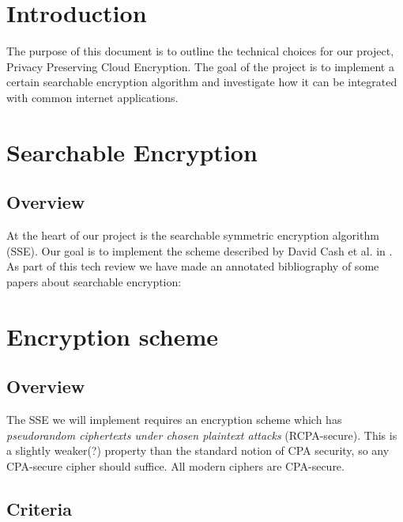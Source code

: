 \section{ Introduction }

The purpose of this document is to outline the technical choices for our project, Privacy Preserving Cloud Encryption. The goal of the project is to implement a certain searchable encryption algorithm and investigate how it can be integrated with common internet applications.


\section{ Searchable Encryption }

\subsection{ Overview }

At the heart of our project is the searchable symmetric encryption algorithm (SSE).
Our goal is to implement the scheme described by David Cash et al. in \cite{cash14}. As part of this tech review we have made an annotated bibliography of some papers about searchable encryption:
\cite{yavuz15}
\cite{cash14}
\cite{song00}


\section{ Encryption scheme }

\subsection{ Overview }

The SSE we will implement requires an encryption scheme which has \textit{pseudorandom ciphertexts under chosen plaintext attacks} (RCPA-secure).
This is a slightly weaker(?) property than the standard notion of CPA security,
so any CPA-secure cipher should suffice. All modern ciphers are CPA-secure.


\subsection{ Criteria }


